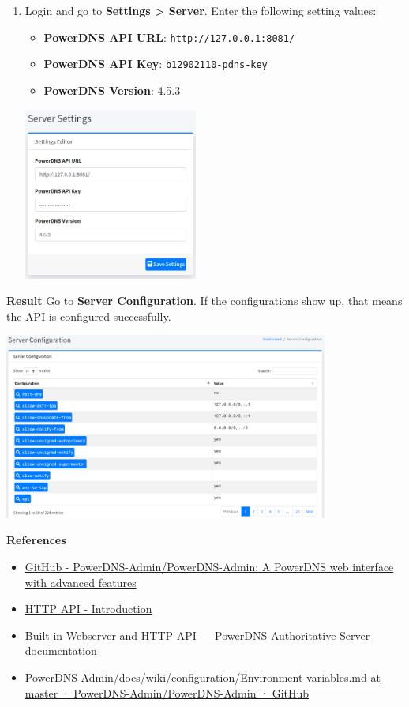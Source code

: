 \documentclass[12pt, a4paper]{article}
\begin{document}
\begin{enumerate}
\begin{enumerate}
      \pagebreak
      \item Login and go to \textbf{Settings > Server}. Enter the following setting values:
      \begin{itemize}
        \item \textbf{PowerDNS API URL}: \verb|http://127.0.0.1:8081/|
        \item \textbf{PowerDNS API Key}: \verb|b12902110-pdns-key|
        \item \textbf{PowerDNS Version}: 4.5.3
      \end{itemize}

      \includegraphics[width=0.45\textwidth]{4-1_server_settings.png}
    \end{enumerate}

    \textbf{Result} Go to \textbf{Server Configuration}. If the configurations show up,
    that means the API is configured successfully.

    \includegraphics[width=0.8\textwidth]{4-2_server_configuration.png}

    \textbf{References}

    \begin{itemize}
      \item \href{https://github.com/PowerDNS-Admin/PowerDNS-Admin}{GitHub - PowerDNS-Admin/PowerDNS-Admin: A PowerDNS web interface with advanced features}
      \item \href{https://doc.powerdns.com/md/httpapi/README/}{HTTP API - Introduction}
      \item \href{https://doc.powerdns.com/authoritative/http-api/index.html}{Built-in Webserver and HTTP API — PowerDNS Authoritative Server  documentation}
      \item \href{https://github.com/PowerDNS-Admin/PowerDNS-Admin/blob/master/docs/wiki/configuration/Environment-variables.md}{PowerDNS-Admin/docs/wiki/configuration/Environment-variables.md at master · PowerDNS-Admin/PowerDNS-Admin · GitHub}
    \end{itemize}


\end{enumerate}
\end{document}

